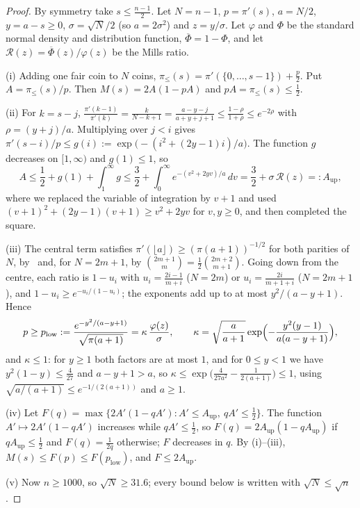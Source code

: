 \documentclass[11pt]{amsart}
\theoremstyle{remark}
\newcommand{\Phib}{\overline{\Phi}}
\begin{document}
\begin{proof}
By symmetry take $s\le\frac{n-1}2$. Let $N=n-1$, $p=\pi'(s)$, $a=N/2$, $y=a-s\ge0$, $\sigma=\sqrt N/2$ (so $a=2\sigma^2$) and $z=y/\sigma$. Let $\varphi$ and $\Phi$ be the standard normal density and distribution function, $\Phib=1-\Phi$, and let $\mathcal R(z)=\Phib(z)/\varphi(z)$ be the Mills ratio.

(i) Adding one fair coin to $N$ coins, $\pi_\le(s)=\pi'(\{0,\dots,s-1\})+\frac p2$. Put $A=\pi_\le(s)/p$. Then $M(s)=2A(1-pA)$ and $pA=\pi_\le(s)\le\frac12$.

(ii) For $k=s-j$, $\frac{\pi'(k-1)}{\pi'(k)}=\frac{k}{N-k+1}=\frac{a-y-j}{a+y+j+1}\le\frac{1-\rho}{1+\rho}\le e^{-2\rho}$ with $\rho=(y+j)/a$. Multiplying over $j<i$ gives $\pi'(s-i)/p\le g(i):=\exp\bigl(-(i^2+(2y-1)i)/a\bigr)$. The function $g$ decreases on $[1,\infty)$ and $g(1)\le1$, so
\[
 A\le\frac12+g(1)+\int_1^\infty g\le\frac32+\int_0^\infty e^{-(v^2+2yv)/a}\,dv=\frac32+\sigma\,\mathcal R(z)=:A_{\mathrm{up}},
\]
where we replaced the variable of integration by $v+1$ and used $(v+1)^2+(2y-1)(v+1)\ge v^2+2yv$ for $v,y\ge0$, and then completed the square.

(iii) The central term satisfies $\pi'(\lfloor a\rfloor)\ge(\pi(a+1))^{-1/2}$ for both parities of $N$, by~\cite{Kaz56} and, for $N=2m+1$, by $\binom{2m+1}m=\frac12\binom{2m+2}{m+1}$. Going down from the centre, each ratio is $1-u_i$ with $u_i=\frac{2i-1}{m+i}$ ($N=2m$) or $u_i=\frac{2i}{m+1+i}$ ($N=2m+1$), and $1-u_i\ge e^{-u_i/(1-u_i)}$; the exponents add up to at most $y^2/(a-y+1)$. Hence
\[
 p\ge p_{\mathrm{low}}:=\frac{e^{-y^2/(a-y+1)}}{\sqrt{\pi(a+1)}}=\kappa\,\frac{\varphi(z)}{\sigma},\qquad \kappa=\sqrt{\frac a{a+1}}\exp\Bigl(-\frac{y^2(y-1)}{a(a-y+1)}\Bigr),
\]
and $\kappa\le1$: for $y\ge1$ both factors are at most $1$, and for $0\le y<1$ we have $y^2(1-y)\le\frac4{27}$ and $a-y+1>a$, so $\kappa\le\exp\bigl(\frac4{27a^2}-\frac1{2(a+1)}\bigr)\le1$, using $\sqrt{a/(a+1)}\le e^{-1/(2(a+1))}$ and $a\ge1$.

(iv) Let $F(q)=\max\{2A'(1-qA'):A'\le A_{\mathrm{up}},\ qA'\le\frac12\}$. The function $A'\mapsto2A'(1-qA')$ increases while $qA'\le\frac12$, so $F(q)=2A_{\mathrm{up}}(1-qA_{\mathrm{up}})$ if $qA_{\mathrm{up}}\le\frac12$ and $F(q)=\frac1{2q}$ otherwise; $F$ decreases in $q$. By (i)--(iii), $M(s)\le F(p)\le F(p_{\mathrm{low}})$, and $F\le2A_{\mathrm{up}}$.

(v) Now $n\ge1000$, so $\sqrt N\ge31.6$; every bound below is written with $\sqrt N\le\sqrt n$.


\end{proof}
\end{document}

